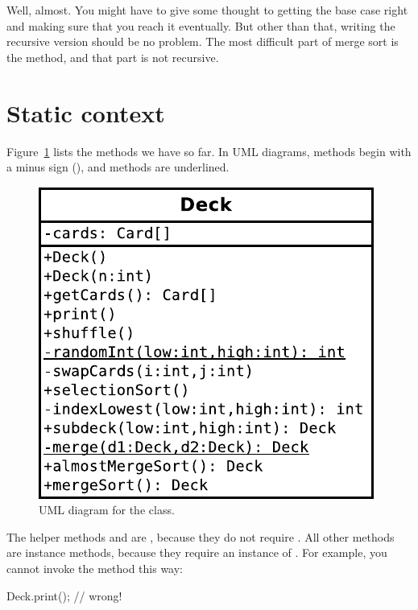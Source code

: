 Well, almost.
You might have to give some thought to getting the base case right and making sure that you reach it eventually.
But other than that, writing the recursive version should be no problem.
The most difficult part of merge sort is the  method, and that part is not recursive.


\section{Static context}

Figure~\ref{fig.deck} lists the  methods we have so far.
In UML diagrams,  methods begin with a minus sign (\java{-}), and  methods are underlined.

\begin{figure}[!ht]
\begin{center}
\includegraphics{figs/deck.pdf}
\caption{UML diagram for the  class.}
\label{fig.deck}
\end{center}
\end{figure}

The helper methods  and  are , because they do not require .
All other methods are instance methods, because they require an instance of .
For example, you cannot invoke the  method this way:

\begin{code}
Deck.print();  // wrong!
\end{code}


